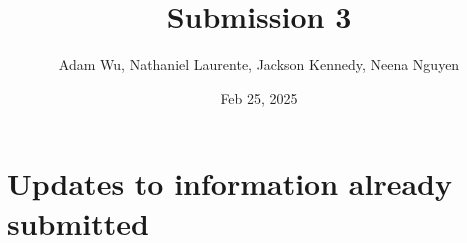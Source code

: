 \documentclass{article}
\title{Submission 3}
\author{Adam Wu, Nathaniel Laurente, Jackson Kennedy, Neena Nguyen}
\date{Feb 25, 2025}
\begin{document}
\maketitle
\tableofcontents
\newpage




\newpage %



\section{Updates to information already submitted}
\end{document}
